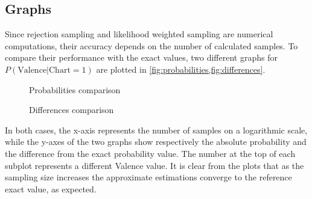 \documentclass[a4paper, 12pt]{article}
\begin{document}
\subsection{Graphs}

Since rejection sampling and likelihood weighted sampling are numerical computations, their accuracy depends on the number of calculated samples. To compare their performance with the exact values, two different graphs for $P\left(\mathrm{Valence} | \mathrm{Chart} = 1\right)$ are plotted in \cref{fig:probabilities,fig:differences}.

\begin{figure}
    \centering
    \caption{Probabilities comparison}
    \label{fig:probabilities}
\end{figure}

\begin{figure}
    \centering
    \caption{Differences comparison}
    \label{fig:differences}
\end{figure}

In both cases, the x-axis represents the number of samples on a logarithmic scale, while the y-axes of the two graphs show respectively the absolute probability and the difference from the exact probability value. The number at the top of each subplot represents a different Valence value. It is clear from the plots that as the sampling size increases the approximate estimations converge to the reference exact value, as expected.


\clearpage


\printbibliography[heading=bibintoc]
\end{document}
